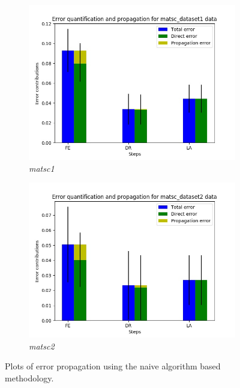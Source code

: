 \begin{figure}[H]
\begin{subfigure}{.5\textwidth}
  \includegraphics[scale=0.4]{img/EP/error_propagation_random_pipeline_matsc_dataset1}
  \caption{\textit{matsc1}}
  \label{fig:sfig3}
\end{subfigure}%
\begin{subfigure}{.5\textwidth}
  \centering
  \includegraphics[scale=0.4]{img/EP/error_propagation_random_pipeline_matsc_dataset2}
  \caption{\textit{matsc2}}
  \label{fig:sfig4}
\end{subfigure}

\caption{Plots of error propagation using the naive algorithm based methodology.}
\label{fig:fig}
\end{figure}


